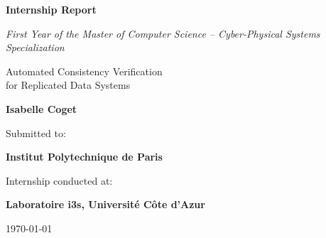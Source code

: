 \documentclass[12pt]{article}
\begin{document}
\begin{titlepage}
    \centering
    \vspace*{2.5cm}
    
    {\LARGE \textbf{Internship Report} \par}
    \vspace{0.5cm}
    {\large \slshape First Year of the Master of Computer Science -- Cyber-Physical Systems Specialization}
    \vspace{2cm}
    
    {\LARGE {Automated Consistency Verification\\ for Replicated Data Systems} \par}
    \vspace{2cm}
    
    {\Large \textbf{Isabelle Coget} \par}
    \vspace{1cm}
    
    Submitted to: \\
    {\large \textbf{Institut Polytechnique de Paris} \par}
    \vspace{0.5cm}
    
    Internship conducted at: \\
    {\large \textbf{Laboratoire i3s, Université Côte d'Azur } \par}
    
   \vfill
   
   {\today}
    
\end{titlepage}

\end{document}

